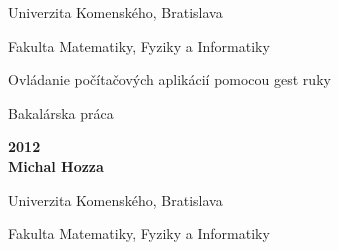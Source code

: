 \documentclass[a4paper,12pt,openany]{book} %
\renewcommand\baselinestretch{1.3} %
\def\mftitle{Ovládanie počítačových aplikácií pomocou gest ruky}
\def\mfthesistype{Bakalárska práca}
\def\mfauthor{Michal Hozza}
\def\mfadvisor{RNDr. Marek Nagy}
\def\mfdate{2012}
\def\mfuniversity{Univerzita Komenského, Bratislava}
\def\mffakulta{Fakulta Matematiky, Fyziky a Informatiky}
\begin{document}
\frontmatter

\thispagestyle{empty}

\noindent
\begin{center}
\begin{minipage}{0.8\textwidth}
\centerline{\renewcommand\baselinestretch{1.3} \LARGE\sc\mfuniversity}
\centerline{\sc\mffakulta}
\end{minipage}
\end{center}

\vfill
\begin{center}
\begin{minipage}{1\textwidth}
\bigskip\bigskip
\begin{center}
\linespread{1}\LARGE\sc\mftitle
\end{center}
\smallskip
\centerline{\mfthesistype}
\bigskip
\bigskip
\bigskip\bigskip
\end{minipage}
\end{center}
\vfill
{\bf\mfdate\\
\indent\mfauthor}
\eject %


\thispagestyle{empty}

\noindent
\begin{center}
\begin{minipage}{0.8\textwidth}
\centerline{\LARGE\sc\mfuniversity}
\centerline{\sc\mffakulta}
\end{minipage}
\end{center}
\end{document}
